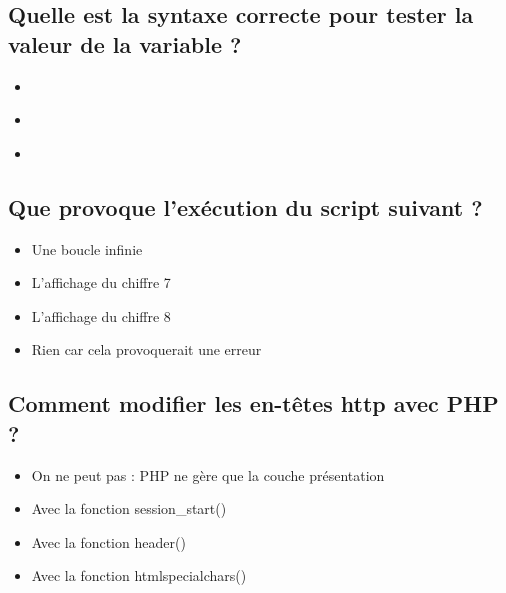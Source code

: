 \documentclass[11pt,a4paper]{article}
\begin{document}
\subsection{Quelle est la syntaxe correcte pour tester la valeur de la variable  ?}

\begin{itemize}
\item[\CaseCoche]  \\
\item[\CaseCoche]  \\
\item[\CaseCoche]  \\  %
\end{itemize}


\subsection{Que provoque l'exécution du script suivant ?}


\bigskip

\begin{itemize}
\item[\CaseCoche] Une boucle infinie \\
\item[\CaseCoche] L'affichage du chiffre 7 \\
\item[\CaseCoche] L'affichage du chiffre 8 \\  %
\item[\CaseCoche] Rien car cela provoquerait une erreur \\
\end{itemize}


\subsection{Comment modifier les en-têtes http avec PHP ?}

\bigskip

\begin{itemize}
\item[\CaseCoche] On ne peut pas : PHP ne gère que la couche présentation \\
\item[\CaseCoche] Avec la fonction session\_start() \\  %
\item[\CaseCoche] Avec la fonction header()\\  %
\item[\CaseCoche] Avec la fonction htmlspecialchars()\\
\end{itemize}
\end{document}
